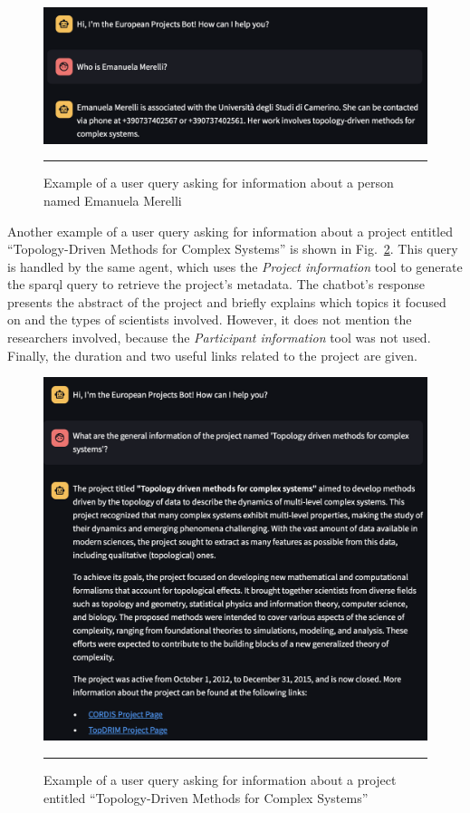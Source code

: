 \begin{figure}[htbp]
    \centering
 \includegraphics[width=.8\textwidth]{figures/implementation/example-who-is-emanuela-merelli.png}
     \rule{35em}{0.5pt}
    \caption{Example of a user query asking for information about a person named Emanuela Merelli}
 \label{fig:example-who-is-emanuela-merelli}
\end{figure}

Another example of a user query asking for information about a project entitled ``Topology-Driven Methods for Complex Systems'' is shown in Fig.~\ref{fig:example-general-info-about-topology-driven-methods-for-complex-systems-project}.
This query is handled by the same agent, which uses the \textit{Project information} tool to generate the \gls{sparql} query to retrieve the project's metadata.
The chatbot's response presents the abstract of the project and briefly explains which topics it focused on and the types of scientists involved.
However, it does not mention the researchers involved, because the \textit{Participant information} tool was not used.
Finally, the duration and two useful links related to the project are given.

\begin{figure}[htbp]
    \centering
 \includegraphics[width=.8\textwidth]{figures/implementation/example-general-info-about-topology-driven-methods-for-complex-systems-project.png}
     \rule{35em}{0.5pt}
    \caption{Example of a user query asking for information about a project entitled ``Topology-Driven Methods for Complex Systems''}
 \label{fig:example-general-info-about-topology-driven-methods-for-complex-systems-project}
\end{figure}

